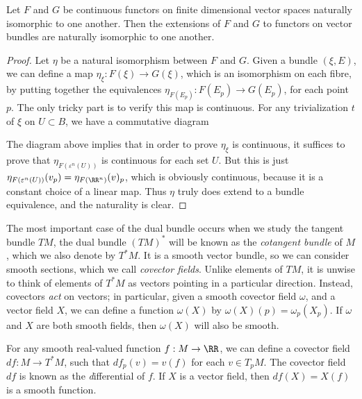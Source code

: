 \begin{theorem}
    Let $F$ and $G$ be continuous functors on finite dimensional vector spaces naturally isomorphic to one another. Then the extensions of $F$ and $G$ to functors on vector bundles are naturally isomorphic to one another.
\end{theorem}
\begin{proof}
    Let $\eta$ be a natural isomorphism between $F$ and $G$. Given a bundle $(\xi,E)$, we can define a map $\eta_\xi: F(\xi) \to G(\xi)$, which is an isomorphism on each fibre, by putting together the equivalences $\eta_{F(E_p)}: F(E_p) \to G(E_p)$, for each point $p$. The only tricky part is to verify this map is continuous. For any trivialization $t$ of $\xi$ on $U \subset B$, we have a commutative diagram
    \begin{center}
    \end{center}
    The diagram above implies that in order to prove $\eta_\xi$ is continuous, it suffices to prove that $\eta_{F(\varepsilon^n(U))}$ is continuous for each set $U$. But this is just $\eta_{F(\varepsilon^n(U))}(v_p) = \eta_{F(\RR^n)}(v)_p$, which is obviously continuous, because it is a constant choice of a linear map. Thus $\eta$ truly does extend to a bundle equivalence, and the naturality is clear.
\end{proof}

The most important case of the dual bundle occurs when we study the tangent bundle $TM$, the dual bundle $(TM)^*$ will be known as the \emph{cotangent bundle} of $M$, which we also denote by $T^*M$. It is a smooth vector bundle, so we can consider smooth sections, which we call {\it covector fields}. Unlike elements of $TM$, it is unwise to think of elements of $T^*M$ as vectors pointing in a particular direction. Instead, covectors \emph{act} on vectors; in particular, given a smooth covector field $\omega$, and a vector field $X$, we can define a function $\omega(X)$ by $\omega(X)(p) = \omega_p(X_p)$. If $\omega$ and $X$ are both smooth fields, then $\omega(X)$ will also be smooth.

\begin{example}
    For any smooth real-valued function $f: M \to \RR$, we can define a covector field $df: M \to T^*M$, such that $df_p(v) = v(f)$ for each $v \in T_pM$. The covector field $df$ is known as the {\emph differential} of $f$. If $X$ is a vector field, then $df(X) = X(f)$ is a smooth function.
\end{example}

